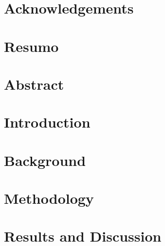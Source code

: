 \documentclass[a4paper,12pt,twoside]{book}
\begin{document}
\frontmatter


%




 \setcounter{page}{1}

\chapter*{Acknowledgements}


\chapter*{Resumo}


\chapter*{Abstract}


\cleardoublepage
{}\setcounter{page}{1}
\tableofcontents

\listoffigures
{}

\listoftables
{}

\printglossary[type=\acronymtype]



\mainmatter
\chapter{Introduction}
\label{chap:introduction}


\chapter{Background}
\label{chap:background}


\chapter{Methodology}
\label{chap:methodology}


\chapter{Results and Discussion}
\label{chap:results}

\end{document}
